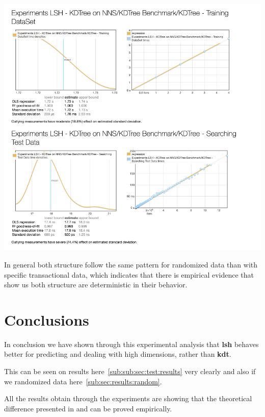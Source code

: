 \documentclass[12pt, a4paper]{article}
\begin{document}
\begin{itemize}
 \begin{minipage}[t]{\linewidth}
  \includegraphics[width=\textwidth]{random_bench_kdt}
  \captionsetup{type=figure}
  \label{fig:random_bench_kdt}
 \end{minipage}


\end{itemize}

In general both structure follow the same pattern for randomized data than with specific transactional data, which indicates that there is empirical evidence that show us both structure are deterministic in their behavior.

\section{Conclusions}
In conclusion we have shown through this experimental analysis that \textbf{\acrlong{lsh}} behaves better for predicting and dealing with high dimensions, rather than \textbf{\acrlong{kdt}}.

This can be seen on results here~\ref{sub:sub:sec:test:results} very clearly and also if we randomized data here~\ref{sub:sec:results:random}.

All the results obtain through the experiments are showing that the theoretical difference presented in \cite{hmw1} and \cite{hmw2} can be proved empirically.
\end{document}
